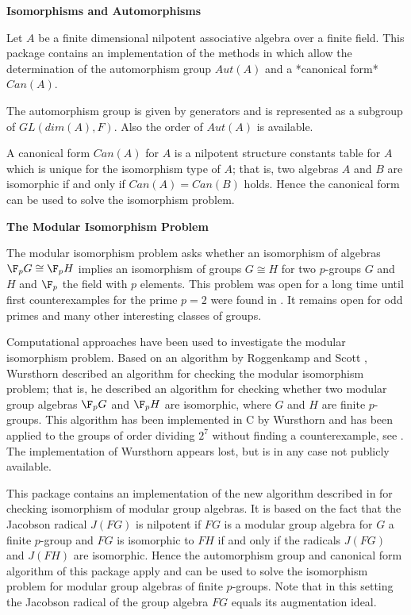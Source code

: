 {\bf Isomorphisms and Automorphisms}

Let $A$ be a finite dimensional nilpotent associative algebra over a 
finite field. This package contains an implementation of the methods 
in \cite{Eic07} which allow the determination of the automorphism group 
$Aut(A)$ and a *canonical form* $Can(A)$. 

The automorphism group is given by generators and is represented as a
subgroup of $GL(dim(A), F)$. Also the order of $Aut(A)$ is available.

A canonical form $Can(A)$ for $A$ is a nilpotent structure constants 
table for $A$ which is unique for the isomorphism type of $A$; 
that is, two algebras $A$ and $B$ are isomorphic if and only if $Can(A) 
= Can(B)$ holds. Hence the canonical form can be used to solve the 
isomorphism problem. 
\medskip

{\bf The Modular Isomorphism Problem}

The modular isomorphism problem asks whether an isomorphism of algebras $\F_p G \cong \F_p H$ implies
an isomorphism of groups $G \cong H$ for two $p$-groups $G$ and $H$ and $\F_p$ the field with $p$
elements. This problem was open for a long time until first counterexamples
for the prime $p=2$ were found in \cite{GLMdR22}. It remains open for odd
primes and many other interesting classes of groups.

Computational approaches have been used to investigate the modular isomorphism
problem. Based on an algorithm by Roggenkamp and Scott \cite{RS93}, Wursthorn
\cite{Wur93} described an algorithm for checking the modular isomorphism
problem; that is, he described an algorithm for checking whether two modular
group algebras $\F_p G$ and $\F_p H$ are isomorphic, where $G$ and $H$ are finite
$p$-groups. This algorithm has been
implemented in C by Wursthorn and has been applied to the groups of
order dividing $2^7$ without finding a counterexample, see \cite{BKRW99}.
The implementation of Wursthorn appears lost, but is in any case not publicly
available.
\medskip

This package contains an implementation of the new algorithm described in
\cite{Eic07} for checking isomorphism of modular group algebras. It is based
on the fact that the Jacobson radical $J(FG)$ is nilpotent if $FG$ is a 
modular group algebra for $G$ a finite $p$-group and $FG$ is isomorphic to $FH$ if and only if the radicals
$J(FG)$ and $J(FH)$ are isomorphic. Hence the automorphism group and canonical form 
algorithm of this package apply and can be used to solve the isomorphism
problem for modular group algebras of finite $p$-groups. Note that in this setting the Jacobson radical of the group algebra $FG$ equals its augmentation ideal.

